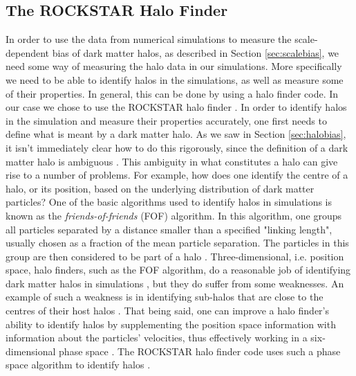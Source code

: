 \documentclass[10pt,letterpaper,final]{iopart}
\numberwithin{equation}{subsection}
\begin{document}
%


\subsection{The ROCKSTAR Halo Finder}\label{sec:rockstar}

In order to use the data from numerical simulations to measure the scale-dependent bias of dark matter halos, as described in Section \ref{sec:scalebias}, we need some way of measuring the halo data in our simulations. More specifically we need to be able to identify halos in the simulations, as well as measure some of their properties. In general, this can be done by using a halo finder code. In our case we chose to use the ROCKSTAR halo finder \cite{Rockstar}. In order to identify halos in the simulation and measure their properties accurately, one first needs to define what is meant by a dark matter halo. As we saw in Section \ref{sec:halobias}, it isn't immediately clear how to do this rigorously, since the definition of a dark matter halo is ambiguous \cite{Rockstar}. This ambiguity in what constitutes a halo can give rise to a number of problems. For example, how does one identify the centre of a halo, or its position, based on the underlying distribution of dark matter particles? One of the basic algorithms used to identify halos in simulations is known as the \emph{friends-of-friends} (FOF) algorithm. In this algorithm, one groups all particles separated by a distance smaller than a specified "linking length", usually chosen as a fraction of the mean particle separation.   The particles in this group are then considered to be part of a halo \cite{Schneider}\cite{Rockstar}. Three-dimensional, i.e. position space, halo finders, such as the FOF algorithm, do a reasonable job of identifying dark matter halos in simulations \cite{Rockstar}, but they do suffer from some weaknesses. An example of such a weakness is in identifying sub-halos that are close to the centres of their host halos \cite{Rockstar}. That being said, one can improve a halo finder's ability to identify halos by supplementing the position space information with information about the particles' velocities, thus effectively working in a six-dimensional phase space \cite{Rockstar}. The ROCKSTAR halo finder code uses such a phase space algorithm to identify halos \cite{Rockstar}. 
\end{document}
